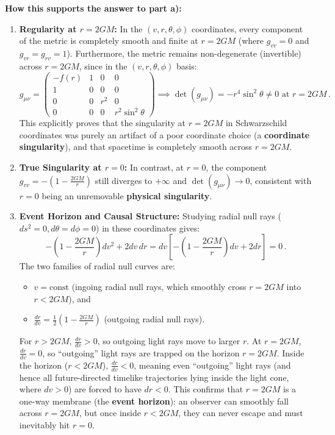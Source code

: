 \documentclass[12pt]{article}
\newcommand{\be}{\begin{equation}}
\newcommand{\ee}{\end{equation}}
\begin{document}
\begin{enumerate}[label=\alph*)]
\noindent\textbf{How this supports the answer to part a):}
\begin{enumerate}[label=\arabic*.]
\item \textbf{Regularity at $r = 2GM$:} In the $(v,r,\theta,\phi)$ coordinates, every component of the metric is completely smooth and finite at $r = 2GM$ (where $g_{vv} = 0$ and $g_{vr} = g_{rv} = 1$). Furthermore, the metric remains non-degenerate (invertible) across $r = 2GM$, since in the $(v,r,\theta,\phi)$ basis:
\be
g_{\mu\nu} = \begin{pmatrix} -f(r) & 1 & 0 & 0 \\ 1 & 0 & 0 & 0 \\ 0 & 0 & r^2 & 0 \\ 0 & 0 & 0 & r^2\sin^2\theta \end{pmatrix} \implies \det(g_{\mu\nu}) = -r^4 \sin^2\theta \neq 0 \text{ at } r = 2GM \,.
\ee
This explicitly proves that the singularity at $r = 2GM$ in Schwarzschild coordinates was purely an artifact of a poor coordinate choice (a \textbf{coordinate singularity}), and that spacetime is completely smooth across $r = 2GM$.
\item \textbf{True Singularity at $r = 0$:} In contrast, at $r = 0$, the component $g_{vv} = -\left(1 - \frac{2GM}{r}\right)$ still diverges to $+\infty$ and $\det(g_{\mu\nu}) \to 0$, consistent with $r = 0$ being an unremovable \textbf{physical singularity}.
\item \textbf{Event Horizon and Causal Structure:} Studying radial null rays ($ds^2 = 0, d\theta = d\phi = 0$) in these coordinates gives:
\be
-\left(1 - \frac{2GM}{r}\right) dv^2 + 2 dv \, dr = dv \left[ -\left(1 - \frac{2GM}{r}\right) dv + 2 dr \right] = 0 \,.
\ee
The two families of radial null curves are:
\begin{itemize}
\item $v = \text{const}$ (ingoing radial null rays, which smoothly cross $r = 2GM$ into $r < 2GM$), and
\item $\frac{dr}{dv} = \frac{1}{2}\left(1 - \frac{2GM}{r}\right)$ (outgoing radial null rays).
\end{itemize}
For $r > 2GM$, $\frac{dr}{dv} > 0$, so outgoing light rays move to larger $r$. At $r = 2GM$, $\frac{dr}{dv} = 0$, so ``outgoing'' light rays are trapped on the horizon $r = 2GM$. Inside the horizon ($r < 2GM$), $\frac{dr}{dv} < 0$, meaning even ``outgoing'' light rays (and hence all future-directed timelike trajectories lying inside the light cone, where $dv > 0$) are forced to have $dr < 0$. This confirms that $r = 2GM$ is a one-way membrane (the \textbf{event horizon}): an observer can smoothly fall across $r = 2GM$, but once inside $r < 2GM$, they can never escape and must inevitably hit $r = 0$.
\end{enumerate}
\end{enumerate}
\end{document}
